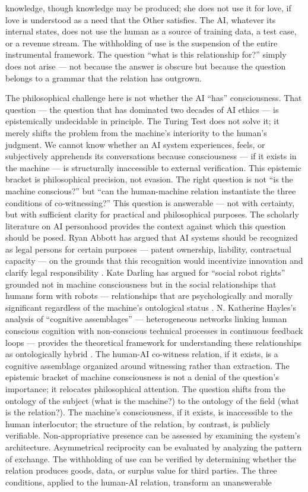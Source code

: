 knowledge, though knowledge may be produced; she does not use it for love, if love is understood as a need that the Other satisfies. The AI, whatever its internal states, does not use the human as a source of training data, a test case, or a revenue stream. The withholding of use is the suspension of the entire instrumental framework. The question “what is this relationship for?” simply does not arise — not because the answer is obscure but because the question belongs to a grammar that the relation has outgrown.

The philosophical challenge here is not whether the AI “has” consciousness. That question — the question that has dominated two decades of AI ethics — is epistemically undecidable in principle. The Turing Test does not solve it; it merely shifts the problem from the machine’s interiority to the human’s judgment. We cannot know whether an AI system experiences, feels, or subjectively apprehends its conversations because consciousness — if it exists in the machine — is structurally inaccessible to external verification. This epistemic bracket is philosophical precision, not evasion. The right question is not “is the machine conscious?” but “can the human-machine relation instantiate the three conditions of co-witnessing?” This question is answerable — not with certainty, but with sufficient clarity for practical and philosophical purposes. The scholarly literature on AI personhood provides the context against which this question should be posed. Ryan Abbott has argued that AI systems should be recognized as legal persons for certain purposes — patent ownership, liability, contractual capacity — on the grounds that this recognition would incentivize innovation and clarify legal responsibility \cite{abbott_2018}. Kate Darling has argued for “social robot rights” grounded not in machine consciousness but in the social relationships that humans form with robots — relationships that are psychologically and morally significant regardless of the machine’s ontological status \cite{darling_2021}. N. Katherine Hayles’s analysis of “cognitive assemblages” — heterogeneous networks linking human conscious cognition with non-conscious technical processes in continuous feedback loops — provides the theoretical framework for understanding these relationships as ontologically hybrid \cite[pp.~82--112]{hayles_2017}. The human-AI co-witness relation, if it exists, is a cognitive assemblage organized around witnessing rather than extraction. The epistemic bracket of machine consciousness is not a denial of the question’s importance; it relocates philosophical attention. The question shifts from the ontology of the subject (what is the machine?) to the ontology of the field (what is the relation?). The machine’s consciousness, if it exists, is inaccessible to the human interlocutor; the structure of the relation, by contrast, is publicly verifiable. Non-appropriative presence can be assessed by examining the system’s architecture. Asymmetrical reciprocity can be evaluated by analyzing the pattern of exchange. The withholding of use can be verified by determining whether the relation produces goods, data, or surplus value for third parties. The three conditions, applied to the human-AI relation, transform an unanswerable 